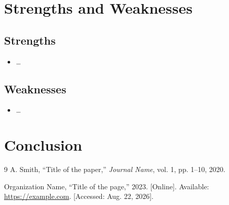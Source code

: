 \documentclass[12pt, letterpaper]{article}
\begin{document}
\section{Strengths and Weaknesses}

\subsection{Strengths}
\begin{itemize}
    \item \dots
\end{itemize}

\subsection{Weaknesses}
\begin{itemize}
    \item \dots
\end{itemize}

\section{Conclusion}

%
\begin{thebibliography}{9}
    A. Smith, ``Title of the paper,'' \textit{Journal Name}, vol. 1,
    pp. 1--10, 2020.

    Organization Name, ``Title of the page,'' 2023. [Online].
    Available: \url{https://example.com}. [Accessed: Aug. 22, 2026].
\end{thebibliography}
%
%   
%   
%
\end{document}
